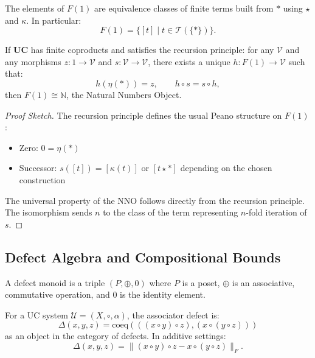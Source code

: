 \documentclass[11pt]{article}
\begin{document}
\begin{enumerate}
\begin{lemma}[Structure of $F(1)$]
The elements of $F(1)$ are equivalence classes of finite terms built from $*$ using $\star$ and $\kappa$. In particular:
\[
F(1) = \{ [t] \mid t \in \mathcal{T}(\{*\}) \}.
\]
\end{lemma}

\begin{conjecture}
If $\mathbf{UC}$ has finite coproducts and satisfies the recursion principle: for any $\mathcal{V}$ and any morphisms $z: 1 \to \mathcal{V}$ and $s: \mathcal{V} \to \mathcal{V}$, there exists a unique $h: F(1) \to \mathcal{V}$ such that:
\[
h(\eta(*)) = z, \qquad h \circ s = s \circ h,
\]
then $F(1) \cong \mathbb{N}$, the Natural Numbers Object.
\end{conjecture}

\begin{proof}[Proof Sketch]
The recursion principle defines the usual Peano structure on $F(1)$:
\begin{itemize}
    \item Zero: $0 = \eta(*)$
    \item Successor: $s([t]) = [\kappa(t)]$ or $[t \star *]$ depending on the chosen construction
\end{itemize}
The universal property of the NNO follows directly from the recursion principle. The isomorphism sends $n$ to the class of the term representing $n$-fold iteration of $s$.
\end{proof}

\subsection{Defect Algebra and Compositional Bounds}

\begin{definition}
A defect monoid is a triple $(P, \oplus, 0)$ where $P$ is a poset, $\oplus$ is an associative, commutative operation, and $0$ is the identity element.
\end{definition}

\begin{definition}
For a UC system $\mathcal{U} = (X, \circ, \alpha)$, the associator defect is:
\[
\Delta(x, y, z) = \text{coeq}(((x \circ y) \circ z), (x \circ (y \circ z)))
\]
as an object in the category of defects. In additive settings:
\[
\Delta(x, y, z) = \| (x \circ y) \circ z - x \circ (y \circ z) \|_F.
\]
\end{definition}


\end{enumerate}
\end{document}
